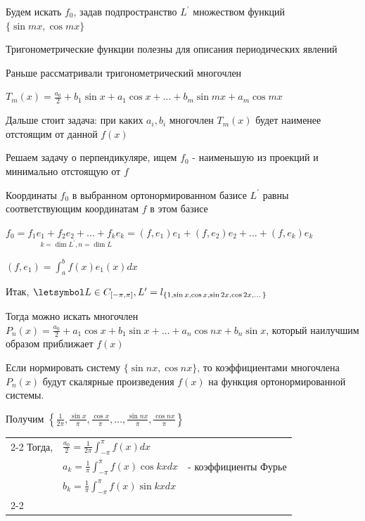 \documentclass[12pt]{article}
\begin{document}
    Будем искать $f_0$, задав подпространство $L^\prime$ множеством функций $\{\sin mx, \cos mx\}$

    Тригонометрические функции полезны для описания периодических явлений

    Раньше рассматривали тригонометрический многочлен

    $T_m(x) = \frac{a_0}{2} + b_1 \sin x + a_1 \cos x + \dots + b_m \sin mx + a_m \cos mx$

    Дальше стоит задача: при каких $a_i, b_i$ многочлен $T_m(x)$ будет наименее отстоящим от данной $f(x)$



    \Mem Решаем задачу о перпендикуляре, ищем $f_0$ - наименьшую из проекций и минимально отстоящую от $f$

    Координаты $f_0$ в выбранном ортонормированном базисе $L^\prime$ равны соответствующим координатам $f$ в этом базисе

    $f_0 = \underset{k = \dim L^\prime, n = \dim L}{f_1 e_1 + f_2 e_2 + \dots + f_k e_k} = 
    (f, e_1) e_1 + (f, e_2) e_2 + \dots + (f, e_k) e_k$

    $(f, e_1) = \int_a^b f(x) e_1(x) dx$

    \Nota Итак, $\letsymbol L \in C_{[-\pi, \pi]}, L^\prime = l_{\{1, \sin x, \cos x, \sin 2x, \cos 2x, \dots\}}$

    Тогда можно искать многочлен $P_n(x) = \frac{a_0}{2} + a_1 \cos x + b_1 \sin x + \dots + a_n \cos nx + b_n \sin x$, который
    наилучшим образом приближает $f(x)$

    Если нормировать систему $\{\sin nx, \cos nx\}$, то коэффициентами многочлена $P_n(x)$ будут скалярные произведения
    $f(x)$ на функция ортонормированной системы. 
    
    Получим $\left\{\frac{1}{2\pi}, \frac{\sin x}{\pi}, \frac{\cos x}{\pi}, \dots, \frac{\sin nx}{\pi}, \frac{\cos nx}{\pi}\right\}$

    {
        \begin{tabular}{l|l|l}
            \cline{2-2}
            Тогда, & $\frac{a_0}{2} = \frac{1}{2\pi} \int_{-\pi}^\pi f(x) dx$ & \\
            & $a_k = \frac{1}{\pi} \int_{-\pi}^\pi f(x) \cos kx dx$ & - коэффициенты Фурье \\
            & $b_k = \frac{1}{\pi} \int_{-\pi}^\pi f(x) \sin kx dx$ & \\
            \cline{2-2}
        \end{tabular}
    }
\end{document}
